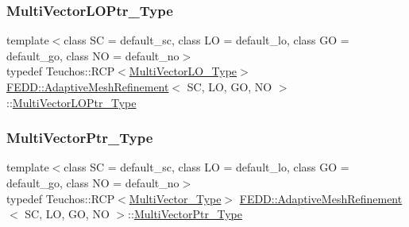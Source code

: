\subsubsection{\texorpdfstring{Multi\+Vector\+L\+O\+Ptr\+\_\+\+Type}{MultiVectorLOPtr\_Type}}
{\footnotesize\ttfamily template$<$class SC  = default\+\_\+sc, class LO  = default\+\_\+lo, class GO  = default\+\_\+go, class NO  = default\+\_\+no$>$ \\
typedef Teuchos\+::\+R\+CP$<$\hyperlink{classFEDD_1_1AdaptiveMeshRefinement_ae48fff0bc9a94bc0332516f1d1e05d92}{Multi\+Vector\+L\+O\+\_\+\+Type}$>$ \hyperlink{classFEDD_1_1AdaptiveMeshRefinement}{F\+E\+D\+D\+::\+Adaptive\+Mesh\+Refinement}$<$ SC, LO, GO, NO $>$\+::\hyperlink{classFEDD_1_1AdaptiveMeshRefinement_a838fdef10af2d85bf1259037b821019e}{Multi\+Vector\+L\+O\+Ptr\+\_\+\+Type}}

\mbox{\label{classFEDD_1_1AdaptiveMeshRefinement_af4fb11adbdf1bba9bcaf8952324d32f2}} 
\subsubsection{\texorpdfstring{Multi\+Vector\+Ptr\+\_\+\+Type}{MultiVectorPtr\_Type}}
{\footnotesize\ttfamily template$<$class SC  = default\+\_\+sc, class LO  = default\+\_\+lo, class GO  = default\+\_\+go, class NO  = default\+\_\+no$>$ \\
typedef Teuchos\+::\+R\+CP$<$\hyperlink{classFEDD_1_1AdaptiveMeshRefinement_afba165f2caa97c6de40654b1ee51e38d}{Multi\+Vector\+\_\+\+Type}$>$ \hyperlink{classFEDD_1_1AdaptiveMeshRefinement}{F\+E\+D\+D\+::\+Adaptive\+Mesh\+Refinement}$<$ SC, LO, GO, NO $>$\+::\hyperlink{classFEDD_1_1AdaptiveMeshRefinement_af4fb11adbdf1bba9bcaf8952324d32f2}{Multi\+Vector\+Ptr\+\_\+\+Type}}

\mbox{\label{classFEDD_1_1AdaptiveMeshRefinement_a5af7c0982afd7187a77c802477675cc6}} 
